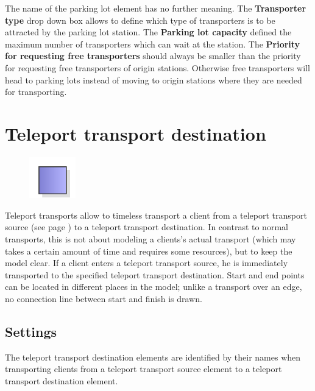The name of the parking lot element has no further meaning.
The \textbf{Transporter type} drop down box allows to define which
type of transporters is to be attracted by the parking lot station.
The \textbf{Parking lot capacity} defined the maximum number of
transporters which can wait at the station. The
\textbf{Priority for requesting free transporters} should always be
smaller than the priority for requesting free transporters of
origin stations. Otherwise free transporters will head to parking
lots instead of moving to origin stations where they are needed
for transporting.


\section{Teleport transport destination}
\label{ref:ModelElementTeleportDestination}

\begin{figure}
\vspace{-22pt}
\includegraphics[width=2cm]{imageModelElementTeleportDestination.png}
\vspace{-22pt}
\end{figure}

Teleport transports allow to timeless transport a client from a 
teleport transport source (see page \pageref{ref:ModelElementTeleportSource}) 
to a teleport transport destination.
In contrast to normal transports, this is not about modeling a clients's actual transport
(which may takes a certain amount of time and requires some resources), but to keep the model clear.
If a client enters a teleport transport source, he is immediately transported to the specified
teleport transport destination. Start and end points can be located in different places in the model;
unlike a transport over an edge, no connection line between start and finish is drawn.

\subsection*{Settings}

The teleport transport destination elements are identified by their names when transporting
clients from a teleport transport source element to a teleport transport destination element.


